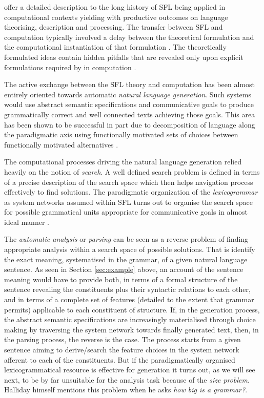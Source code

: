 \citet{ODonnell2005} offer a detailed description to the long history of SFL being applied in computational contexts yielding with productive outcomes on language theorising, description and processing. The transfer between SFL and computation typically involved a delay between the theoretical formulation and the computational instantiation of that formulation \citep[139]{BatemanMatthiessen88} \citep[19]{MatthiessenBateman91}. The theoretically formulated ideas contain hidden pitfalls that are revealed only upon explicit formulations required by in computation \citep[27]{Bateman2008}. 

The active exchange between the SFL theory and computation has been almost entirely oriented towards automatic \textit{natural language generation}. Such systems would use abstract semantic specifications and communicative goals to produce grammatically correct and well connected texts achieving those goals. This area has been shown to be successful in part due to decomposition of language along the paradigmatic axis using functionally motivated sets of choices between functionally motivated alternatives \citep{McDonald80}.

The computational processes driving the natural language generation relied heavily on the notion of \textit{search}. A well defined search problem is defined in terms of a precise description of the search space which then helps navigation process effectively to find solutions. The paradigmatic organization of the \textit{lexicogrammar} as system networks assumed within SFL turns out to organise the search space for possible grammatical units appropriate for communicative goals in almost ideal manner \citep[28]{Bateman2008}.

The \textit{automatic analysis} or \textit{parsing} can be seen as a reverse problem of finding appropriate analysis within a search space of possible solutions. That is identify the exact meaning, systematised in the grammar, of a given natural language sentence. As seen in Section \ref{sec:example} above, an account of the sentence meaning would have to provide both, in terms of a formal structure of the sentence revealing the constituents plus their syntactic relations to each other, and in terms of a complete set of features (detailed to the extent that grammar permits) applicable to each constituent of structure. If, in the generation process, the abstract semantic specifications are increasingly materialised through choice making by traversing the system network towards finally generated text, then, in the parsing process, the reverse is the case. The process starts from a given sentence aiming to derive/search the feature choices in the system network afferent to each of the constituents. But if the paradigmatically organised lexicogrammatical resource is effective for generation it turns out, as we will see next, to be by far unsuitable for the analysis task because of the \textit{size problem}. Halliday himself mentions this problem when he asks \textit{how big is a grammar?}.

